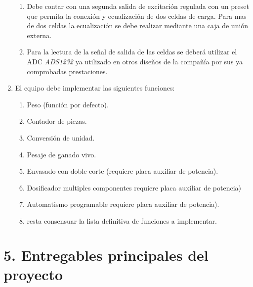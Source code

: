 \documentclass[11pt]{charter}
\begin{document}
\begin{enumerate}
\begin{enumerate}
	\item Debe contar con una segunda salida de excitación regulada con un preset que permita la conexión y ecualización de dos celdas de carga. Para mas de dos celdas la ecualización se debe realizar mediante una caja de unión externa.
	\item Para la lectura de la señal de salida de las celdas se deberá utilizar el ADC \textit{ADS1232} ya utilizado en otros diseños de la compañía por sus ya comprobadas prestaciones.
	\end{enumerate}	
\item El equipo debe implementar las siguientes funciones:
	\begin{enumerate}
	\item Peso (función por defecto).
	\item Contador de piezas.
	\item Conversión de unidad. 
	\item Pesaje de ganado vivo.
	\item Envasado con doble corte (requiere placa auxiliar de potencia).
	\item Dosificador multiples componentes requiere placa auxiliar de potencia)
	\item Automatismo programable requiere placa auxiliar de potencia).
	\item \color{red} resta consensuar la lista definitiva de funciones a implementar.
	\end{enumerate}				
\end{enumerate}

%

\section{5. Entregables principales del proyecto}
\label{sec:entregables}
\end{document}
